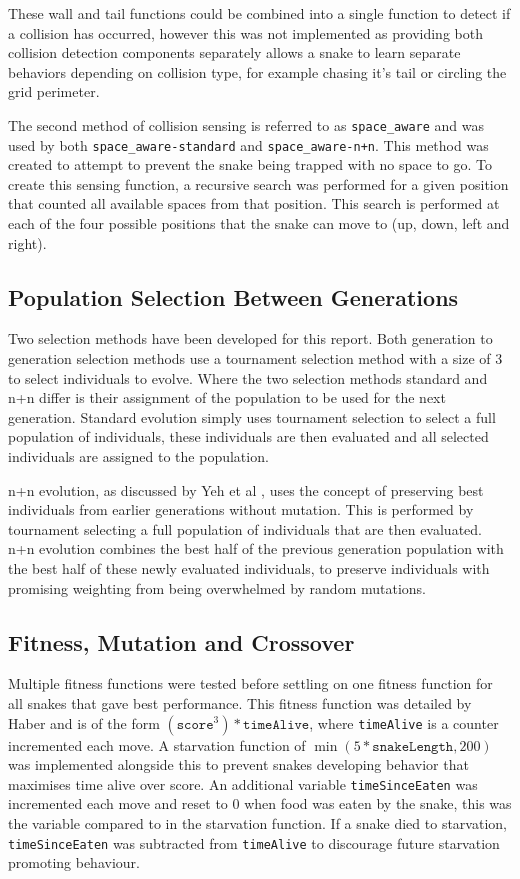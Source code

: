 These wall and tail functions could be combined into a single function to detect if a collision has occurred, however this was not implemented as providing both collision detection components separately allows a snake to learn separate behaviors depending on collision type, for example chasing it's tail or circling the grid perimeter.

The second method of collision sensing is referred to as \verb|space_aware| and was used by both \verb|space_aware-standard| and \verb|space_aware-n+n|. This method was created to attempt to prevent the snake being trapped with no space to go. To create this sensing function, a recursive search was performed for a given position that counted all available spaces from that position. This search is performed at each of the four possible positions that the snake can move to (up, down, left and right).

\subsection{Population Selection Between Generations}
Two selection methods have been developed for this report. Both generation to generation selection methods use a tournament selection method with a size of 3 to select individuals to evolve. Where the two selection methods standard and n+n differ is their assignment of the population to be used for the next generation. Standard evolution simply uses tournament selection to select a full population of individuals, these individuals are then evaluated and all selected individuals are assigned to the population. 

n+n evolution, as discussed by Yeh et al \cite{nplusn}, uses the concept of preserving best individuals from earlier generations without mutation. This is performed by tournament selecting a full population of individuals that are then evaluated. n+n evolution combines the best half of the previous generation population with the best half of these newly evaluated individuals, to preserve individuals with promising weighting from being overwhelmed by random mutations.

\subsection{Fitness, Mutation and Crossover}
Multiple fitness functions were tested before settling on one fitness function for all snakes that gave best performance. This fitness function was detailed by Haber \cite{craig} and is of the form $(\texttt{score}^3) * \texttt{timeAlive}$, where \texttt{timeAlive} is a counter incremented each move. A starvation function of $\min(5 * \texttt{snakeLength}, 200)$ was implemented alongside this to prevent snakes developing behavior that maximises time alive over score. An additional variable \texttt{timeSinceEaten} was incremented each move and reset to 0 when food was eaten by the snake, this was the variable compared to in the starvation function. If a snake died to starvation, \texttt{timeSinceEaten} was subtracted from \texttt{timeAlive} to discourage future starvation promoting behaviour.

